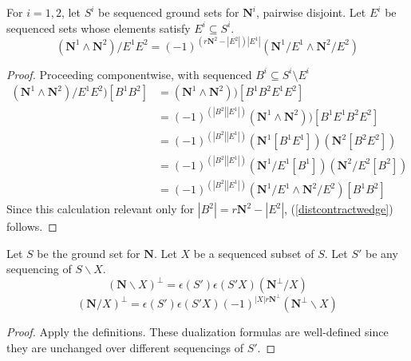\documentclass[Unicode]{cedram-alco}
\newcommand{\ext}[1]{\ensuremath{\mathbf{#1}}}
\begin{document}
    \begin{prop}
      For $i=1, 2$, let $S^{i}$ be sequenced ground sets for $\ext{N}^{i}$, pairwise disjoint.
      Let $E^i$ be sequenced sets whose elements satisfy $E^i\subseteq S^i$.
      \begin{equation}\label{distcontractwedge}
        (\ext{N}^1 \wedge \ext{N}^2)/E^1E^2 = (-1)^{(r\ext{N}^2-|E^2|) |E^1|} (\ext{N}^1/E^1 \wedge \ext{N}^2/E^2)
      \end{equation}
    \end{prop}
    \begin{proof}
      Proceeding componentwise, with sequenced $B^i\subseteq S^i\setminus E^i$
      \begin{equation*}
        \begin{split}
      (\ext{N}^1 \wedge \ext{N}^2)/E^1E^2)[B^1B^2]
      &=(\ext{N}^1 \wedge \ext{N}^2))[B^1B^2E^1E^2]
      \\
      &=(-1)^{(|B^2| |E^1|)} (\ext{N}^1 \wedge \ext{N}^2))[B^1E^1B^2E^2]
      \\
      &=(-1)^{(|B^2| |E^1|)} (\ext{N}^1[B^1E^1])( \ext{N}^2[B^2E^2])
      \\
      &=(-1)^{(|B^2| |E^1|)} (\ext{N}^1/E^1[B^1])( \ext{N}^2/E^2[B^2])
      \\
      &=(-1)^{(|B^2| |E^1|)} (\ext{N}^1/E^1 \wedge \ext{N}^2/E^2)[B^1B^2]
        \end{split}
      \end{equation*}
      Since this calculation relevant only for $|B^2|=r\ext{N}^2-|E^2|$, (\ref{distcontractwedge}) follows.
    \end{proof}

\begin{prop}\label{delecontdualprop}
  Let $S$ be the ground set for $\ext{N}$.
  Let $X$ be a sequenced subset of $S$.
  Let $S'$ be any sequencing of $S\backslash X$.
    \begin{equation}\label{dualDelete} (\ext{N}\backslash X)^\perp = \epsilon(S')\epsilon(S'X)(\ext{N}^\perp/X)
    \end{equation}
    \begin{equation}\label{dualContract} (\ext{N}/X)^\perp = \epsilon(S')\epsilon(S'X)(-1)^{|X|r\ext{N}^\perp}(\ext{N}^\perp\backslash X)
    \end{equation}
\end{prop}
\begin{proof}
  Apply the definitions.  These dualization formulas are well-defined since they
  are unchanged over different sequencings of $S'$.
\end{proof}
\end{document}
